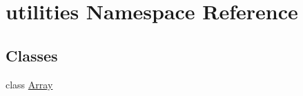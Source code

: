 \hypertarget{namespaceutilities}{
\section{utilities Namespace Reference}
\label{namespaceutilities}
}
\subsection*{Classes}
\begin{DoxyCompactItemize}
\item 
class \hyperlink{classutilities_1_1Array}{Array}
\end{DoxyCompactItemize}
